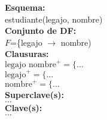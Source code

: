 \documentclass[preview]{standalone}
\begin{document}
\textbf{Esquema:}\\
estudiante(legajo, nombre)\\

\textbf{Conjunto de DF:}\\
$F$=\{legajo $\rightarrow$ nombre)\\

\textbf{Clausuras:}\\
$\text{legajo nombre}^+ = \big\{\dots$\\
$\text{legajo}^+ = \big\{\dots$\\
$\text{nombre}^+ = \big\{\dots$\\

\textbf{Superclave(s):}\\
$\dots$\\

\textbf{Clave(s):}\\
$\dots$
\end{document}
